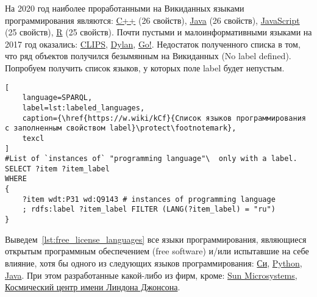 На 2020 год наиболее проработанными на Викиданных языками программирования являются: \href{https://www.wikidata.org/wiki/Q2407}{C++} (26 свойств), \href{https://www.wikidata.org/wiki/Q251}{Java} (26 свойств), \href{https://www.wikidata.org/wiki/Q2005}{JavaScript} (25 свойств), \href{https://www.wikidata.org/wiki/Q206904}{R} (25 свойств).
Почти пустыми и малоинформативными языками на 2017 год оказались: \href{https://www.wikidata.org/wiki/Q165372}{CLIPS}, \href{https://www.wikidata.org/wiki/Q1268744}{Dylan}, \href{https://www.wikidata.org/wiki/Q3109515}{Go!}.
Недостаток полученного списка в том, что ряд объектов получился безымянным на Викиданных (No label defined). Попробуем получить список языков, у которых поле label  будет непустым.

\label{question:prog_lang_1}

\begin{lstlisting}[
	language=SPARQL,
	label=lst:labeled_languages,
	caption={\href{https://w.wiki/kCf}{Список языков программирования с заполненным свойством label}\protect\footnotemark},
	texcl
]
#List of `instances of` "programming language"\  only with a label.
SELECT ?item ?item_label
WHERE
{
    ?item wdt:P31 wd:Q9143 # instances of programming language
    ; rdfs:label ?item_label FILTER (LANG(?item_label) = "ru")
}
\end{lstlisting}

Выведем~\ref{lst:free_license_languages} все языки программирования, являющиеся открытым программным обеспечением (free software) и/или испытавшие на себе влияние, хотя бы одного из следующих языков программирования: \href{https://en.wikipedia.org/wiki/C_(programming_language)}{Си}, \href{https://ru.wikipedia.org/wiki/Python}{Python}, \href{https://ru.wikipedia.org/wiki/Java}{Java}. При этом разработанные какой-либо из фирм, кроме: \href{https://ru.wikipedia.org/wiki/Sun_Microsystems}{Sun Microsystems}, \href{https://en.wikipedia.org/wiki/Johnson_Space_Center}{Космический центр имени Линдона Джонсона}.

